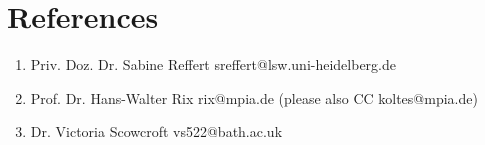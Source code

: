 \section*{References}

\begin{enumerate}
    \item Priv. Doz. Dr. Sabine Reffert \hfill sreffert@lsw.uni-heidelberg.de
    \item Prof. Dr. Hans-Walter Rix \hfill rix@mpia.de (please also CC koltes@mpia.de)
    \item Dr. Victoria Scowcroft \hfill vs522@bath.ac.uk
\end{enumerate}